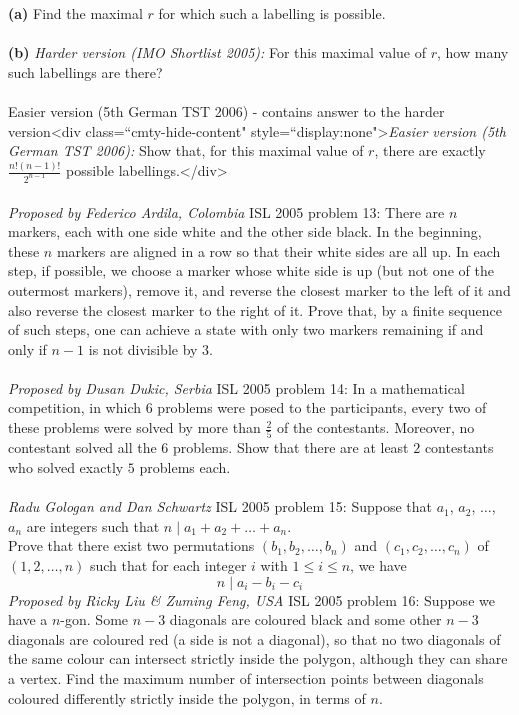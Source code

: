 \textbf{(a)} Find the maximal $r$ for which such a labelling is possible. \\\\
\textbf{(b)} \textit{Harder version (IMO Shortlist 2005):} For this maximal value of $r$, how many such labellings are there? \\\\
Easier version (5th German TST 2006) - contains answer to the harder version<div class=``cmty-hide-content" style=``display:none">\textit{Easier version (5th German TST 2006):} Show that, for this maximal value of $r$, there are exactly $\frac{n!\left(n-1\right)!}{2^{n-1}}$ possible labellings.</div> \\\\
\textit{Proposed by Federico Ardila, Colombia} 
ISL 2005 problem 13:  There are $ n$ markers, each with one side white and the other side black. In the beginning, these $ n$ markers are aligned in a row so that their white sides are all up. In each step, if possible, we choose a marker whose white side is up (but not one of the outermost markers), remove it, and reverse the closest marker to the left of it and also reverse the closest marker to the right of it. Prove that, by a finite sequence of such steps, one can achieve a state with only two markers remaining if and only if $ n - 1$ is not divisible by $ 3$. \\\\
\textit{Proposed by Dusan Dukic, Serbia} 
ISL 2005 problem 14:  In a mathematical competition, in which $6$ problems were posed to the participants, every two of these problems were solved by more than $\frac 25$ of the contestants. Moreover, no contestant solved all the $6$ problems. Show that there are at least $2$ contestants who solved exactly $5$ problems each. \\\\
\textit{Radu Gologan and Dan Schwartz} 
ISL 2005 problem 15:  Suppose that $ a_1$, $ a_2$, $ \ldots$, $ a_n$ are integers such that $ n\mid a_1 + a_2 + \ldots + a_n$. \\
Prove that there exist two permutations $ \left(b_1,b_2,\ldots,b_n\right)$ and $ \left(c_1,c_2,\ldots,c_n\right)$ of $ \left(1,2,\ldots,n\right)$ such that for each integer $ i$ with $ 1\leq i\leq n$, we have
\[ n\mid a_i - b_i - c_i \]
\textit{Proposed by Ricky Liu \& Zuming Feng, USA} 
ISL 2005 problem 16:  Suppose we have a $n$-gon. Some $n-3$ diagonals are coloured black and some other $n-3$ diagonals are coloured red (a side is not a diagonal), so that no two diagonals of the same colour can intersect strictly inside the polygon, although they can share a vertex. Find the maximum number of intersection points between diagonals coloured differently strictly inside the polygon, in terms of $n$. \\\\
